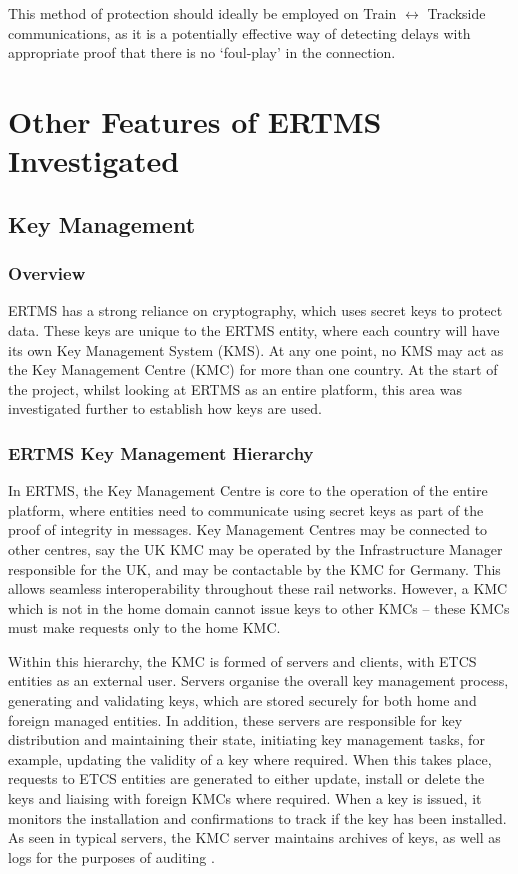 \documentclass[twoside,11pt,a4paper]{article}
\begin{document}
This method of protection should ideally be employed on Train $\leftrightarrow$ Trackside communications, as it is a potentially effective way of detecting delays with appropriate proof that there is no `foul-play' in the connection.

\clearpage

\section{Other Features of ERTMS Investigated}
\subsection{Key Management}
\subsubsection{Overview}
ERTMS has a strong reliance on cryptography, which uses secret keys to protect data. These keys are unique to the ERTMS entity, where each country will have its own Key Management System (KMS). At any one point, no KMS may act as the Key Management Centre (KMC) for more than one country. At the start of the project, whilst looking at ERTMS as an entire platform, this area was investigated further to establish how keys are used.

\subsubsection{ERTMS Key Management Hierarchy}
In ERTMS, the Key Management Centre is core to the operation of the entire platform, where entities need to communicate using secret keys as part of the proof of integrity in messages. Key Management Centres may be connected to other centres, say the UK KMC may be operated by the Infrastructure Manager responsible for the UK, and may be contactable by the KMC for Germany. This allows seamless interoperability throughout these rail networks. However, a KMC which is not in the home domain cannot issue keys to other KMCs -- these KMCs must make requests only to the home KMC. 

Within this hierarchy, the KMC is formed of servers and clients, with ETCS entities as an external user. Servers organise the overall key management process, generating and validating keys, which are stored securely for both home and foreign managed entities. In addition, these servers are responsible for key distribution and maintaining their state, initiating key management tasks, for example, updating the validity of a key where required. When this takes place, requests to ETCS entities are generated to either update, install or delete the keys and liaising with foreign KMCs where required. When a key is issued, it monitors the installation and confirmations to track if the key has been installed. As seen in typical servers, the KMC server maintains archives of keys, as well as logs for the purposes of auditing \citep{KPMG13a}.
\end{document}
